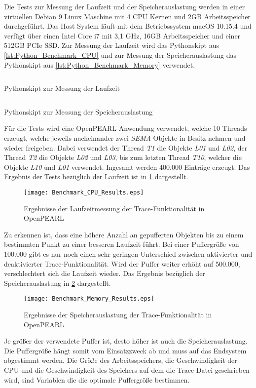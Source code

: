 Die Tests zur Messung der Laufzeit und der Speicherauslastung werden in einer
virtuellen Debian 9 Linux Maschine mit 4 CPU Kernen und 2GB Arbeitsspeicher
durchgeführt. Das Host System läuft mit dem Betriebssystem macOS 10.15.4 und
verfügt über einen Intel Core i7 mit 3,1 GHz, 16GB Arbeitsspeicher und einer
512GB PCIe SSD. Zur Messung der Laufzeit wird das Pythonskipt aus
\cref{lst:Python_Benchmark_CPU} und zur Messung der Speicherauslastung das
Pythonskipt aus \cref{lst:Python_Benchmark_Memory} verwendet.
\begin{listing}[ht]
  \inputminted[frame=lines,linenos]{python}{./Python/benchmark_cpu.py}
  \caption{Pythonskipt zur Messung der Laufzeit}
  \label{lst:Python_Benchmark_CPU}   
\end{listing} 
\begin{listing}[ht]
  \inputminted[frame=lines,linenos]{python}{./Python/benchmark_memory.py}
  \caption{Pythonskipt zur Messung der Speicherauslastung}
  \label{lst:Python_Benchmark_Memory}   
\end{listing}
Für die Tests wird eine OpenPEARL Anwendung verwendet, welche 10 Threads
erzeugt, welche jeweils nacheinander zwei \textit{SEMA} Objekte in Besitz nehmen
und wieder freigeben. Dabei verwendet der Thread \textit{T1} die Objekte
\textit{L01} und \textit{L02}, der Thread \textit{T2} die Objekte \textit{L02}
und \textit{L03}, bis zum letzten Thread \textit{T10}, welcher die Objekte
\textit{L10} und \textit{L01} verwendet. Ingesamt werden 400.000 Einträge
erzeugt. Das Ergebnis der Tests bezüglich der Laufzeit ist in
\cref{fig:BenchmarkCpuResults} dargestellt. 
\begin{figure}[ht]
  \texttt{[image: Benchmark\_CPU\_Results.eps]}
  \caption{Ergebnisse der Laufzeitmessung der Trace-Funktionalität in OpenPEARL}
  \label{fig:BenchmarkCpuResults}
\end{figure}
Zu erkennen ist, dass eine höhere Anzahl an gepufferten Objekten bis zu einem
bestimmten Punkt zu einer besseren Laufzeit führt. Bei einer Puffergröße von
100.000 gibt es nur noch einen sehr geringen Unterschied zwischen aktivierter
und deaktivierter Trace-Funktionalität. Wird der Puffer weiter erhöht auf
500.000, verschlechtert sich die Laufzeit wieder. Das Ergebnis bezüglich der
Speicherauslastung in \cref{fig:BenchmarkMemoryResults} dargestellt.
\begin{figure}[ht]
  \texttt{[image: Benchmark\_Memory\_Results.eps]}
  \caption{Ergebnisse der Speicherauslastung der Trace-Funktionalität in OpenPEARL}
  \label{fig:BenchmarkMemoryResults}
\end{figure}
Je größer der verwendete Puffer ist, desto höher ist auch die
Speicherauslastung. Die Puffergröße hängt somit vom Einsatzzweck ab und muss auf
das Endsystem abgestimmt werden. Die Größe des Arbeitsspeichers, die
Geschwindigkeit der CPU und die Geschwindigkeit des Speichers auf dem die
Trace-Datei geschrieben wird, sind Variablen die die optimale Puffergröße
bestimmen.

